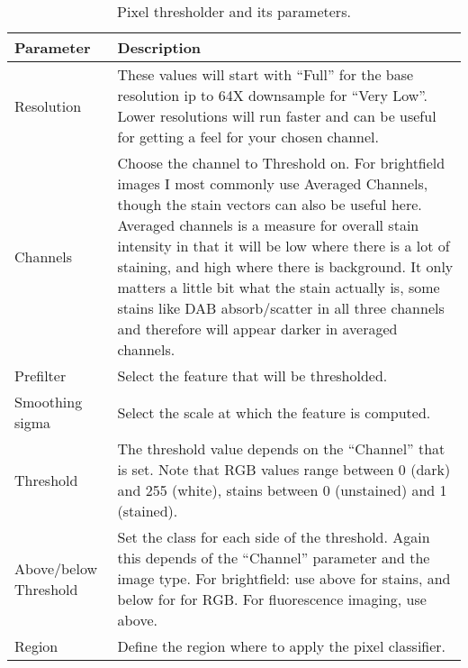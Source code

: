 \documentclass[a4paper,DIV=17,dvipsnames,headsepline]{scrartcl}
\begin{document}
\begin{table}
\begin{center}\scriptsize
\begin{tabular}{p{2cm}p{12cm}} \toprule
Parameter & Description \\ \midrule
Resolution &  These values will start with ``Full'' for the base resolution ip to 64X downsample for ``Very Low''. Lower resolutions will run faster and can be useful for getting a feel for your chosen channel. \\
Channels  & Choose the channel to Threshold on. For brightfield images I most commonly use Averaged Channels, though the stain vectors can also be useful here. Averaged channels is a measure for overall stain intensity in that it will be low where there is a lot of staining, and high where there is background. It only matters a little bit what the stain actually is, some stains like DAB absorb/scatter in all three channels and therefore will appear darker in averaged channels. \\ 
Prefilter & Select the feature that will be thresholded. \\
Smoothing sigma & Select the scale at which the feature is computed.\\
Threshold & The threshold value depends on the ``Channel'' that is set. Note that RGB values range between 0 (dark) and 255 (white), stains between 0 (unstained) and 1 (stained).\\
Above/below Threshold & Set the class for each side of the threshold. Again this depends of the ``Channel'' parameter and the image type. For brightfield: use above for stains, and below for for RGB. For fluorescence imaging, use above.\\
Region & Define the region where to apply the pixel classifier.\\
\bottomrule
\end{tabular}
\end{center}
\caption{Pixel thresholder and its parameters.}\label{tab:thresholder}
\end{table}
\end{document}
